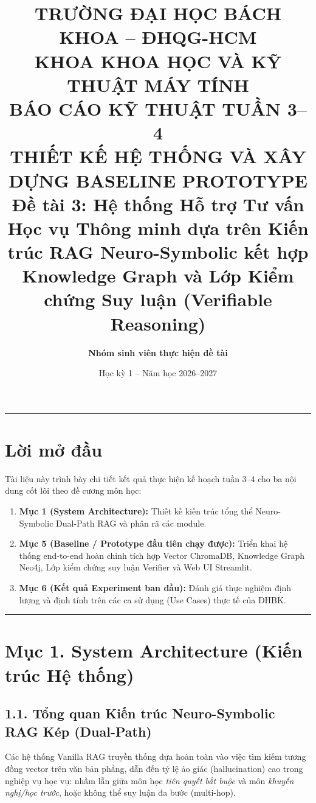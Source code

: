 \documentclass[a4paper,12pt]{article}
\title{
    \vspace{-1.0cm}
    \textbf{\Large TRƯỜNG ĐẠI HỌC BÁCH KHOA -- ĐHQG-HCM}\\
    \textbf{\large KHOA KHOA HỌC VÀ KỸ THUẬT MÁY TÍNH}\\[0.6cm]
    \textbf{\LARGE BÁO CÁO KỸ THUẬT TUẦN 3--4}\\
    \textbf{\large THIẾT KẾ HỆ THỐNG VÀ XÂY DỰNG BASELINE PROTOTYPE}\\[0.3cm]
    \normalsize \textbf{Đề tài 3:} Hệ thống Hỗ trợ Tư vấn Học vụ Thông minh dựa trên Kiến trúc RAG Neuro-Symbolic kết hợp Knowledge Graph và Lớp Kiểm chứng Suy luận (Verifiable Reasoning)
}
\author{\textbf{Nhóm sinh viên thực hiện đề tài}}
\date{Học kỳ 1 -- Năm học 2026--2027}
\begin{document}
\maketitle
\vspace{-0.5cm}
\noindent\rule{\textwidth}{1pt}
\vspace{0.2cm}

\section*{Lời mở đầu}
Tài liệu này trình bày chi tiết kết quả thực hiện kế hoạch tuần 3--4 cho ba nội dung cốt lõi theo đề cương môn học:
\begin{enumerate}[leftmargin=1.5cm, noitemsep]
    \item \textbf{Mục 1 (System Architecture):} Thiết kế kiến trúc tổng thể Neuro-Symbolic Dual-Path RAG và phân rã các module.
    \item \textbf{Mục 5 (Baseline / Prototype đầu tiên chạy được):} Triển khai hệ thống end-to-end hoàn chỉnh tích hợp Vector ChromaDB, Knowledge Graph Neo4j, Lớp kiểm chứng suy luận Verifier và Web UI Streamlit.
    \item \textbf{Mục 6 (Kết quả Experiment ban đầu):} Đánh giá thực nghiệm định lượng và định tính trên các ca sử dụng (Use Cases) thực tế của ĐHBK.
\end{enumerate}

\noindent\rule{\textwidth}{0.5pt}

\section{Mục 1. System Architecture (Kiến trúc Hệ thống)}

\subsection{1.1. Tổng quan Kiến trúc Neuro-Symbolic RAG Kép (Dual-Path)}
Các hệ thống Vanilla RAG truyền thống dựa hoàn toàn vào việc tìm kiếm tương đồng vector trên văn bản phẳng, dẫn đến tỷ lệ ảo giác (hallucination) cao trong nghiệp vụ học vụ: nhầm lẫn giữa môn học \textit{tiên quyết bắt buộc} và môn \textit{khuyến nghị/học trước}, hoặc không thể suy luận đa bước (multi-hop). 
\end{document}
